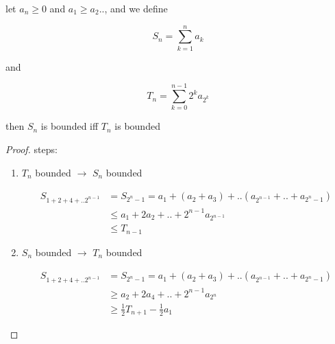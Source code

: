 \begin{exercise}
    let $a_n \ge 0 $ and $a_1 \ge a_2 ..$, and we define

    \[
        S_n = \sum_{k=1}^{n}a_k
    \]

    and

    \[
        T_n = \sum_{k=0}^{n-1}2^ka_{2^k}
    \]

    then $S_n$ is bounded iff $T_n$ is bounded

\end{exercise}

\begin{proof}
    steps:

    \begin{enumerate}
        \item $T_n$ bounded $\to$ $S_n$ bounded

        \begin{align*}
            S_{1 + 2 + 4 + .. 2^{n-1}} & = S_{2^{n} - 1} = a_1 + (a_2 + a_3) + .. (a_{2^{n-1}} + .. + a_{2^{n} - 1}) \\
                & \le a_1 + 2a_2 + .. + 2^{n-1}a_{2^{n-1}} \\
                & \le T_{n-1}
        \end{align*}

        \item $S_n$ bounded $\to$ $T_n$ bounded

        \begin{align*}
            S_{1 + 2 + 4 + .. 2^{n-1}} & = S_{2^{n} - 1} = a_1 + (a_2 + a_3) + .. (a_{2^{n-1}} + .. + a_{2^{n} - 1}) \\ 
            & \ge a_2 + 2a_4 + .. + 2^{n-1}a_{2^n} \\
            & \ge \frac{1}{2}T_{n+1} - \frac{1}{2}a_1
        \end{align*}
    \end{enumerate}
\end{proof}